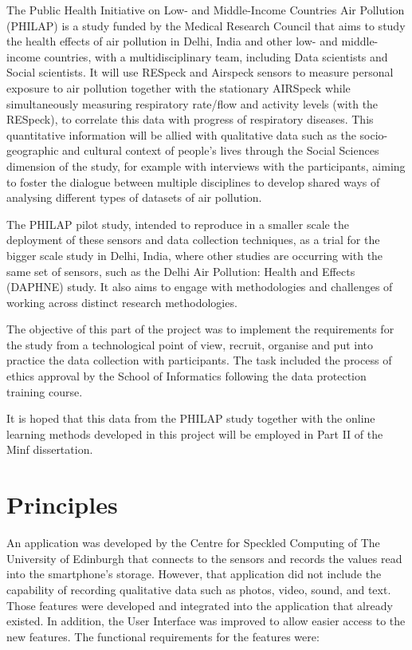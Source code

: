 
The Public Health Initiative on Low- and Middle-Income Countries Air Pollution (PHILAP) is a study funded by the Medical Research Council that aims to study the health effects of air pollution in Delhi, India and other low- and middle-income countries, with a multidisciplinary team, including Data scientists and Social scientists. It will use RESpeck and Airspeck sensors to measure personal exposure to air pollution together with the stationary AIRSpeck while simultaneously measuring respiratory rate/flow and activity levels (with the RESpeck), to correlate this data with progress of respiratory diseases. This quantitative information will be allied with qualitative data such as the socio-geographic and cultural context of people's lives through the Social Sciences dimension of the study, for example with interviews with the participants, aiming to foster the dialogue between multiple disciplines to develop shared ways of analysing different types of datasets of air pollution.

The PHILAP pilot study, intended to reproduce in a smaller scale the deployment of these sensors and data collection techniques, as a trial for the bigger scale study in Delhi, India, where other studies are occurring with the same set of sensors, such as the Delhi Air Pollution: Health and Effects (DAPHNE) study. It also aims to engage with methodologies and challenges of working across distinct research methodologies.

The objective of this part of the project was to implement the requirements for the study from a technological point of view, recruit, organise and put into practice the data collection with participants. The task included the process of ethics approval by the School of Informatics following the data protection training course.

It is hoped that this data from the PHILAP study together with the online learning methods developed in this project will be employed in Part II of the Minf dissertation.

\section{Principles}

An application was developed by the Centre for Speckled Computing of The University of Edinburgh \cite{air-respeckapp} that connects to the sensors and records the values read into the smartphone's storage. However, that application did not include the capability of recording qualitative data such as photos, video, sound, and text. Those features were developed and integrated into the application that already existed. In addition, the User Interface was improved to allow easier access to the new features. The functional requirements for the features were:

